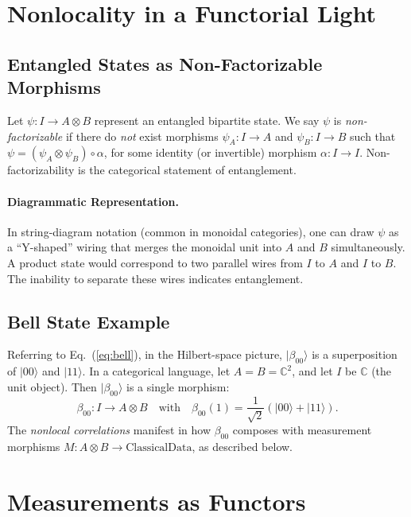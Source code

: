 \documentclass[12pt]{article}
\begin{document}
\section{Nonlocality in a Functorial Light}
\label{sec:nonlocal}

\subsection{Entangled States as Non-Factorizable Morphisms}

Let $\psi: I \to A \otimes B$ represent an entangled bipartite state. We say $\psi$ is \emph{non-factorizable} if there do \emph{not} exist morphisms $\psi_A : I \to A$ and $\psi_B : I \to B$ such that $\psi = (\psi_A \otimes \psi_B) \circ \alpha$, for some identity (or invertible) morphism $\alpha : I \to I$. Non-factorizability is the categorical statement of entanglement.

\paragraph{Diagrammatic Representation.}
In string-diagram notation (common in monoidal categories), one can draw $\psi$ as a ``Y-shaped'' wiring that merges the monoidal unit into $A$ and $B$ simultaneously. A product state would correspond to two parallel wires from $I$ to $A$ and $I$ to $B$. The inability to separate these wires indicates entanglement.

\subsection{Bell State Example}

Referring to Eq.~(\ref{eq:bell}), in the Hilbert-space picture, $|\beta_{00}\rangle$ is a superposition of $|00\rangle$ and $|11\rangle$. In a categorical language, let $A = B = \mathbb{C}^2$, and let $I$ be $\mathbb{C}$ (the unit object). Then $|\beta_{00}\rangle$ is a single morphism:
\begin{equation}
\beta_{00}: I \to A \otimes B
\quad \text{with} \quad
\beta_{00}(1) = \frac{1}{\sqrt{2}}(|00\rangle + |11\rangle).
\end{equation}
The \emph{nonlocal correlations} manifest in how $\beta_{00}$ composes with measurement morphisms $M: A \otimes B \to \text{ClassicalData}$, as described below.

\vspace{1em}

\section{Measurements as Functors}
\label{sec:measurementFunctors}
\end{document}
